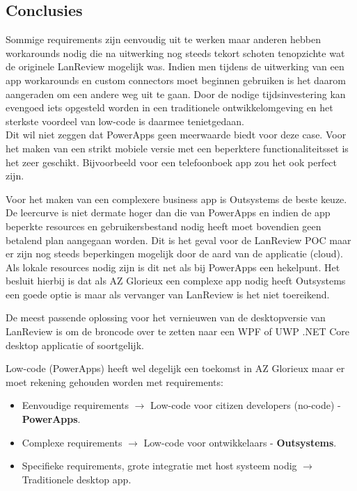 \documentclass[a0,portrait]{a0poster}
\begin{document}
\begin{multicols}{2}
\section*{Conclusies}
\color{black}
Sommige requirements zijn eenvoudig uit te werken maar anderen hebben workarounds nodig die na uitwerking nog steeds tekort schoten tenopzichte wat de originele LanReview mogelijk was. Indien men tijdens de uitwerking van een app workarounds en custom connectors moet beginnen gebruiken is het daarom aangeraden om een andere weg uit te gaan. Door de nodige tijdsinvestering kan evengoed iets opgesteld worden in een traditionele ontwikkelomgeving en het sterkste voordeel van low-code is daarmee tenietgedaan.\\
Dit wil niet zeggen dat PowerApps geen meerwaarde biedt voor deze case. Voor het maken van een strikt mobiele versie met een beperktere functionaliteitsset is het zeer geschikt. Bijvoorbeeld voor een telefoonboek app zou het ook perfect zijn.

Voor het maken van een complexere business app is Outsystems de beste keuze. De leercurve is niet dermate hoger dan die van PowerApps en indien de app beperkte resources en gebruikersbestand nodig heeft moet bovendien geen betalend plan aangegaan worden. Dit is het geval voor de LanReview POC maar er zijn nog steeds beperkingen mogelijk door de aard van de applicatie (cloud). Als lokale resources nodig zijn is dit net als bij PowerApps een hekelpunt. Het besluit hierbij is dat als AZ Glorieux een complexe app nodig heeft Outsystems een goede optie is maar als vervanger van LanReview is het niet toereikend.

De meest passende oplossing voor het vernieuwen van de desktopversie van LanReview is om de broncode over te zetten naar een WPF of UWP .NET Core desktop applicatie of soortgelijk. 

Low-code (PowerApps) heeft wel degelijk een toekomst in AZ Glorieux maar er moet rekening gehouden worden met requirements:
\begin{itemize}
    \item Eenvoudige requirements $\rightarrow$ Low-code voor citizen developers (no-code) - \textbf{PowerApps}.
    \item Complexe requirements $\rightarrow$ Low-code voor ontwikkelaars - \textbf{Outsystems}.
    \item Specifieke requirements, grote integratie met host systeem nodig $\rightarrow$ Traditionele desktop app.
\end{itemize}
\color{HoGentAccent1} 

\end{multicols}
\end{document}
